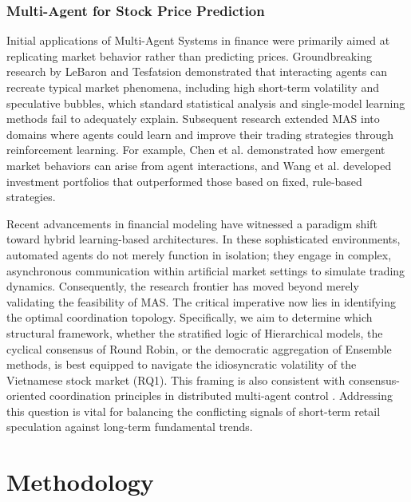 \documentclass{ieeeaccess}
\begin{document}
\subsubsection{Multi-Agent for Stock Price Prediction}
Initial applications of Multi-Agent Systems in finance were primarily aimed at replicating market behavior rather than predicting prices. Groundbreaking research by LeBaron \cite{lebaron2006} and Tesfatsion \cite{tesfatsion2006} demonstrated that interacting agents can recreate typical market phenomena, including high short-term volatility and speculative bubbles, which standard statistical analysis and single-model learning methods fail to adequately explain.
Subsequent research extended MAS into domains where agents could learn and improve their trading strategies through reinforcement learning. For example, Chen et al. \cite{chen2012} demonstrated how emergent market behaviors can arise from agent interactions, and Wang et al. \cite{wang2021} developed investment portfolios that outperformed those based on fixed, rule-based strategies.

Recent advancements in financial modeling have witnessed a paradigm shift toward hybrid learning-based architectures. In these sophisticated environments, automated agents do not merely function in isolation; they engage in complex, asynchronous communication within artificial market settings to simulate trading dynamics. Consequently, the research frontier has moved beyond merely validating the feasibility of MAS. The critical imperative now lies in identifying the optimal coordination topology. Specifically, we aim to determine which structural framework, whether the stratified logic of Hierarchical models, the cyclical consensus of Round Robin, or the democratic aggregation of Ensemble methods, is best equipped to navigate the idiosyncratic volatility of the Vietnamese stock market (RQ1). This framing is also consistent with consensus-oriented coordination principles in distributed multi-agent control \cite{olfati2007consensus,ren2005consensus}. Addressing this question is vital for balancing the conflicting signals of short-term retail speculation against long-term fundamental trends.

\section{Methodology}
\end{document}
